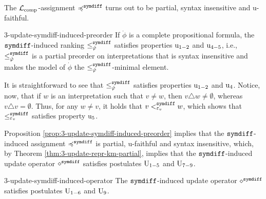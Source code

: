 The $\mathcal{L}_{{\operatorname{comp}}}$-assignment $\preccurlyeq^{\mathtt{symdiff}}$
turns out to be 
partial, syntax insensitive and u-faithful.

\begin{prp}{}{3-update-symdiff-induced-preorder}
	If $\dot{\phi}$ is a complete propositional formula, 
	the $\mathtt{symdiff}$-induced ranking $\le^{\mathtt{symdiff}}_{\dot{\varphi}}$ 
	satisfies properties $\mathrm{u}_{1-2}$ and $\mathrm{u}_{4-5}$, 
	i.e., $\le^{\mathtt{symdiff}}_{\dot{\varphi}}$ is a partial preorder 
	on interpretations that
	is syntax insensitive and 
	makes the model of $\dot{\phi}$ 
	the $\le^{\mathtt{symdiff}}_{\dot{\varphi}}$-minimal element.
\end{prp}
\begin{prf*}{}{}%
	It is straightforward to see that $\le_{\dot{\varphi}}^{\mathtt{symdiff}}$ satisfies 
	properties $\mathrm{u}_{1-2}$ and $\mathrm{u}_{4}$. 
	Notice, now, that if $w$ is an interpretation such that $v\neq w$,
	then $v\triangle w\neq\emptyset$, whereas $v\triangle v = \emptyset$.
	Thus, for any $w\neq v$, it holds that 
	$v<^{\mathtt{symdiff}}_{\varepsilon_v}w$, which shows that $\le^{\mathtt{symdiff}}_{\varepsilon_v}$
	satisfies property $\mathrm{u}_{5}$.
\end{prf*}

Proposition \ref{prop:3-update-symdiff-induced-preorder} 
implies that the $\mathtt{symdiff}$-induced assignment $\preccurlyeq^{\mathtt{symdiff}}$ 
is partial, u-faithful and syntax insensitive, 
which, by Theorem \ref{thm:3-update-repr-km-partial}, 
implies that the $\mathtt{symdiff}$-induced update operator 
$\diamond^{\mathtt{symdiff}}$ satisfies postulates $\mathrm{U}_{1-5}$ and $\mathrm{U}_{7-9}$.

\begin{crl}{}{3-update-symdiff-induced-operator}
	The $\mathtt{symdiff}$-induced update operator $\diamond^{\mathtt{symdiff}}$ 
	satisfies postulates $\mathrm{U}_{1-6}$ and $\mathrm{U}_{9}$.
\end{crl}

